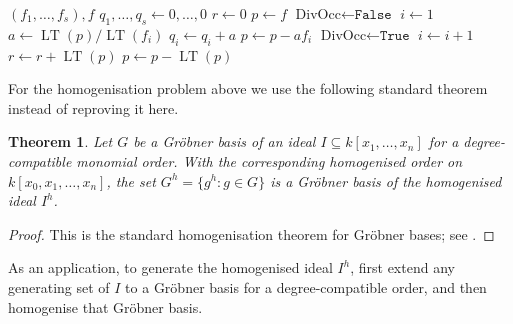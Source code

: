 \documentclass[12pt]{article}
\theoremstyle{plain}
\newtheorem{thm}{Theorem}[subsection] %
\theoremstyle{definition}
\begin{document}
\begin{algorithm}\label{alg:division_alg}
\caption{Multivariable division algorithm}\label{alg:division}
\begin{algorithmic}
\Require $(f_1,\ldots,f_s),f$
\State $q_1,\ldots,q_s\gets 0,\ldots,0$
\State $r\gets 0$
\State $p\gets f$
\State $\text{DivOcc}\gets\texttt{False}$
\State $i\gets 1$
\State $a\gets \operatorname{LT}(p)/\operatorname{LT}(f_i)$
\State $q_i\gets q_i+a$
\State $p\gets p-af_i$
\State $\text{DivOcc}\gets\texttt{True}$
\Else
\State $i\gets i+1$
\EndIf
\EndWhile
{}
\State $r\gets r+\operatorname{LT}(p)$
\State $p\gets p-\operatorname{LT}(p)$
\EndIf
\EndWhile
\State {}
\end{algorithmic}
\end{algorithm}

For the homogenisation problem above we use the following standard theorem instead of reproving it here.
\begin{thm}\label{thm:homogenized_grobner}
Let $G$ be a Gr\"obner basis of an ideal $I\subseteq k[x_1,\ldots,x_n]$ for a degree-compatible monomial order. With the corresponding homogenised order on $k[x_0,x_1,\ldots,x_n]$, the set $G^h=\{g^h:g\in G\}$ is a Gr\"obner basis of the homogenised ideal $I^h$.
\end{thm}
\begin{proof}
This is the standard homogenisation theorem for Gr\"obner bases; see \cite[Chapter 2]{grobner}.
\end{proof}
As an application, to generate the homogenised ideal $I^h$, first extend any generating set of $I$ to a Gr\"obner basis for a degree-compatible order, and then homogenise that Gr\"obner basis.
\end{document}
